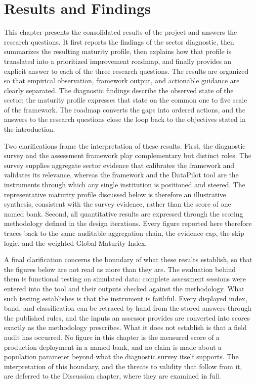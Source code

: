 
\section{Results and Findings}

This chapter presents the consolidated results of the project and answers the research questions. It first reports the findings of the sector diagnostic, then summarizes the resulting maturity profile, then explains how that profile is translated into a prioritized improvement roadmap, and finally provides an explicit answer to each of the three research questions. The results are organized so that empirical observation, framework output, and actionable guidance are clearly separated. The diagnostic findings describe the observed state of the sector; the maturity profile expresses that state on the common one to five scale of the framework. The roadmap converts the gaps into ordered actions, and the answers to the research questions close the loop back to the objectives stated in the introduction.

Two clarifications frame the interpretation of these results. First, the diagnostic survey and the assessment framework play complementary but distinct roles. The survey supplies aggregate sector evidence that calibrates the framework and validates its relevance, whereas the framework and the DataPilot tool are the instruments through which any single institution is positioned and steered. The representative maturity profile discussed below is therefore an illustrative synthesis, consistent with the survey evidence, rather than the score of one named bank. Second, all quantitative results are expressed through the scoring methodology defined in the design iterations. Every figure reported here therefore traces back to the same auditable aggregation chain, the evidence cap, the skip logic, and the weighted Global Maturity Index.

A final clarification concerns the boundary of what these results establish, so that the figures below are not read as more than they are. The evaluation behind them is functional testing on simulated data: complete assessment sessions were entered into the tool and their outputs checked against the methodology. What such testing establishes is that the instrument is faithful. Every displayed index, band, and classification can be retraced by hand from the stored answers through the published rules, and the inputs an assessor provides are converted into scores exactly as the methodology prescribes. What it does not establish is that a field audit has occurred. No figure in this chapter is the measured score of a production deployment in a named bank, and no claim is made about a population parameter beyond what the diagnostic survey itself supports. The interpretation of this boundary, and the threats to validity that follow from it, are deferred to the Discussion chapter, where they are examined in full.

